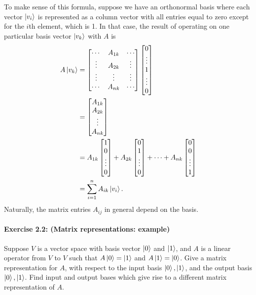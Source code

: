 \documentclass{article}
\begin{document}
To make sense of this formula, suppose we have an orthonormal basis where each
vector $\ket{v_i}$ is represented as a column vector with all entries equal to
zero except for the $i$th element, which is 1. In that case, the result of
operating on one particular basis vector $\ket{v_k}$ with $A$ is
\begin{align*}
  A\ket{v_k}
    &= \begin{bmatrix}
        \cdots & A_{1k} & \cdots \\
        \vdots & A_{2k} & \vdots \\
        \vdots & \vdots & \vdots \\
        \cdots & A_{nk} & \cdots
      \end{bmatrix} \begin{bmatrix}
        0 \\
        \vdots \\
        1 \\
        \vdots \\
        0
      \end{bmatrix} \\
    &= \begin{bmatrix}
        A_{1k} \\
        A_{2k} \\
        \vdots \\
        A_{nk}
      \end{bmatrix} \\
    &= A_{1k}\begin{bmatrix}1 \\ 0 \\ \vdots \\ 0\end{bmatrix}
      + A_{2k}\begin{bmatrix}0 \\ 1 \\ \vdots \\ 0\end{bmatrix}
      + \cdots
      + A_{nk}\begin{bmatrix}0 \\ 0 \\ \vdots \\ 1\end{bmatrix} \\
    &= \sum_{i=1}^n A_{ik}\ket{v_i}.
\end{align*}
Naturally, the matrix entries $A_{ij}$ in general depend on the basis.

\paragraph{\cite{mikeandike} Exercise 2.2: (Matrix representations: example)}
Suppose $V$ is a vector space with basis vector $\ket{0}$ and $\ket{1}$, and
$A$ is a linear operator from $V$ to $V$ such that $A\ket{0} = \ket{1}$ and
$A\ket{1} = \ket{0}$. Give a matrix representation for $A$, with respect to the
input basis $\ket{0}, \ket{1}$, and the output basis $\ket{0}, \ket{1}$. Find
input and output bases which give rise to a different matrix representation of
$A$.
\end{document}
